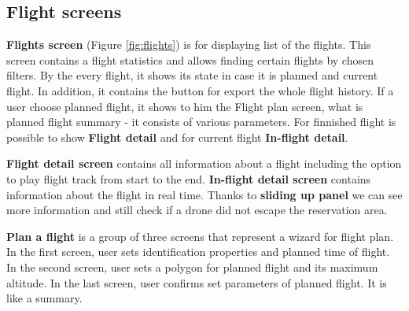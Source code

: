 \subsection{Flight screens}\label{subsec:flight-screens}
\textbf{Flights screen} (Figure \ref{fig:flights}) is for displaying list of the flights.
This screen contains a flight statistics and allows finding certain flights by chosen filters.
By the every flight, it shows its state in case it is planned and current flight.
In addition, it contains the button for export the whole flight history.
If a user choose planned flight, it shows to him the Flight plan screen, what is planned flight summary - it consists of various parameters.
For finnished flight is possible to show \textbf{Flight detail} and for current flight \textbf{In-flight detail}.

\textbf{Flight detail screen} contains all information about a flight including the option to play flight track from start to the end.
\textbf{In-flight detail screen} contains information about the flight in real time.
Thanks to \textbf{sliding up panel} we can see more information and still check if a drone did not escape the reservation area.

\textbf{Plan a flight} is a group of three screens that represent a wizard for flight plan.
In the first screen, user sets identification properties and planned time of flight.
In the second screen, user sets a polygon for planned flight and its maximum altitude.
In the last screen, user confirms set parameters of planned flight.
It is like a summary.


